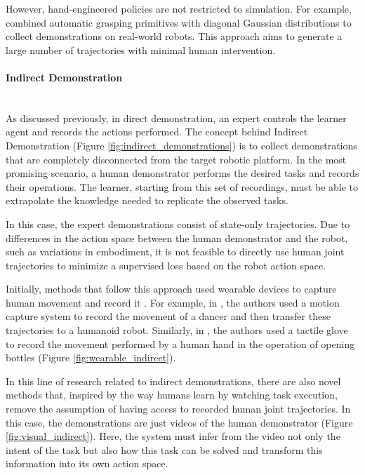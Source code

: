 However, hand-engineered policies are not restricted to simulation. For example, \cite{dasari2020robonet} combined automatic grasping primitives with diagonal Gaussian distributions to collect demonstrations on real-world robots. This approach aims to generate a large number of trajectories with minimal human intervention.



\paragraph*{Indirect Demonstration}   \mbox{} \\ 
As discussed previously, in direct demonstration, an expert controls the learner agent and records the actions performed. The concept behind Indirect Demonstration (Figure \ref{fig:indirect_demonstrations}) is to collect demonstrations that are completely disconnected from the target robotic platform. In the most promising scenario, a human demonstrator performs the desired tasks and records their operations. The learner, starting from this set of recordings, must be able to extrapolate the knowledge needed to replicate the observed tasks.

In this case, the expert demonstrations consist of state-only trajectories. Due to differences in the action space between the human demonstrator and the robot, such as variations in embodiment, it is not feasible to directly use human joint trajectories to minimize a supervised loss based on the robot action space.

Initially, methods that follow this approach used wearable devices to capture human movement and record it \cite{nakaoka2007learning,liu2019_mirroring_without_overimitation}. For example, in \cite{nakaoka2007learning}, the authors used a motion capture system to record the movement of a dancer and then transfer these trajectories to a humanoid robot. Similarly, in \cite{liu2019_mirroring_without_overimitation}, the authors used a tactile glove \cite{liu2017glove_force} to record the movement performed by a human hand in the operation of opening bottles (Figure \ref{fig:wearable_indirect}).

In this line of research related to indirect demonstrations, there are also novel methods \cite{smith2019avid,torabi2019recent_advances_lfo,xiong2021learning_by_watching,wang2023mimicplay,qian2024contrast} that, inspired by the way humans learn by watching task execution, remove the assumption of having access to recorded human joint trajectories. In this case, the demonstrations are just videos of the human demonstrator (Figure \ref{fig:visual_indirect}). Here, the system must infer from the video not only the intent of the task but also how this task can be solved and transform this information into its own action space.

